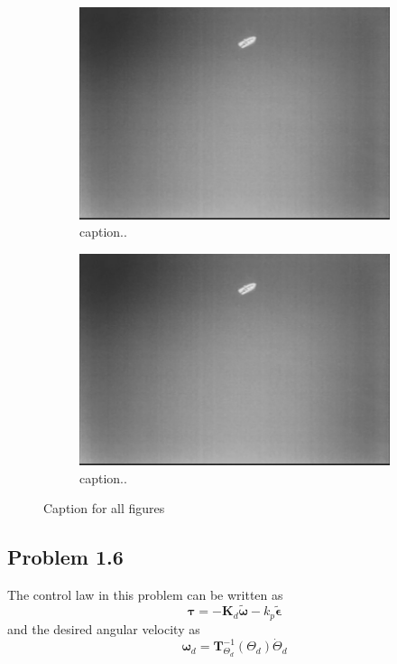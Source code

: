\begin{figure}[ht]
	\begin{subfigure}[b]{0.45\textwidth}
		\includegraphics[width=\textwidth]{fig1}
		\caption{caption..}
		\label{fig:2c}
	\end{subfigure}
	\begin{subfigure}[b]{0.45\textwidth}
		\includegraphics[width=\textwidth]{fig1}
		\caption{caption..}
		\label{fig:2d}
	\end{subfigure}		
	\caption{Caption for all figures}\label{fig:2}
\end{figure}


\subsection*{Problem 1.6}
The control law in this problem can be written as
\begin{equation}
	\boldsymbol{\tau} = -\mathbf{K}_d \tilde{\boldsymbol{\omega}} - k_p \tilde{\boldsymbol{\epsilon}}
\end{equation}
and the desired angular velocity as
\begin{equation}
	\boldsymbol{\omega}_d = \mathbf{T}^{-1}_{\Theta_d}(\Theta_d)\dot{\Theta}_d
\end{equation}

